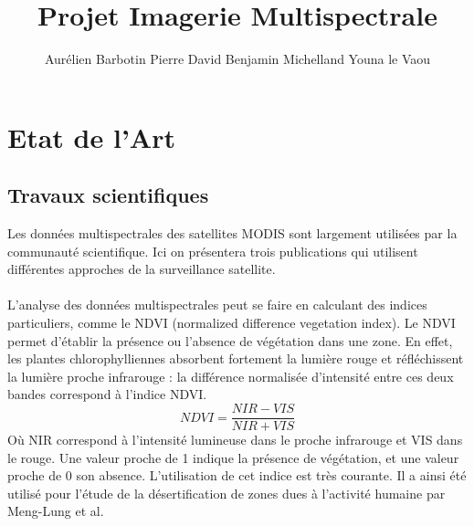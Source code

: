 \documentclass[a4paper,10pt]{article}
\begin{document}
\title{Projet Imagerie Multispectrale}
\author{Aurélien Barbotin Pierre David Benjamin Michelland Youna le Vaou}

\maketitle



\section{Etat de l'Art}
\subsection{Travaux scientifiques}

Les données multispectrales des satellites MODIS sont largement utilisées par la communauté scientifique. Ici on présentera trois publications qui utilisent différentes approches de la surveillance satellite.

\paragraph{}
L'analyse des données multispectrales peut se faire en calculant des indices particuliers, comme le NDVI (normalized difference vegetation index). Le NDVI permet d'établir la présence ou l'absence de végétation dans une zone. En effet, les plantes chlorophylliennes absorbent fortement la lumière rouge et réfléchissent la lumière proche infrarouge : la différence normalisée d'intensité entre ces deux bandes correspond à l'indice NDVI. 
\begin{equation}
NDVI=\frac{NIR-VIS}{NIR+VIS}
\end{equation}
Où NIR correspond à l'intensité lumineuse dans le proche infrarouge et VIS dans le rouge.\newline
Une valeur proche de 1 indique la présence de végétation, et une valeur proche de 0 son absence. L'utilisation de cet indice est très courante. Il a ainsi été utilisé pour l'étude de la désertification de zones dues à l'activité humaine\cite{desert} par Meng-Lung et al.
\end{document}
